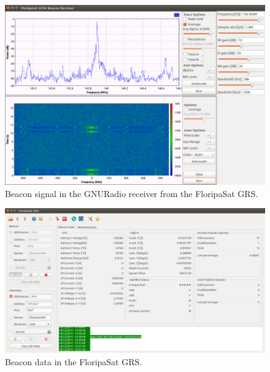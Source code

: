 \documentclass[12pt]{book}
\begin{document}
\begin{appendices}
\begin{figure}[!h]
	\begin{center}
		\includegraphics[width=\textwidth]{figures/beacon-signal-gnuradio.png}
		\caption{Beacon signal in the GNURadio receiver from the FloripaSat GRS.}
		\label{fig:beacon-signal-gnuradio}
	\end{center}
\end{figure}

\begin{figure}[!h]
	\begin{center}
		\includegraphics[width=\textwidth]{figures/beacon-data-grs.png}
		\caption{Beacon data in the FloripaSat GRS.}
		\label{fig:beacon-data-grs}
	\end{center}
\end{figure}

\end{appendices}
\end{document}
